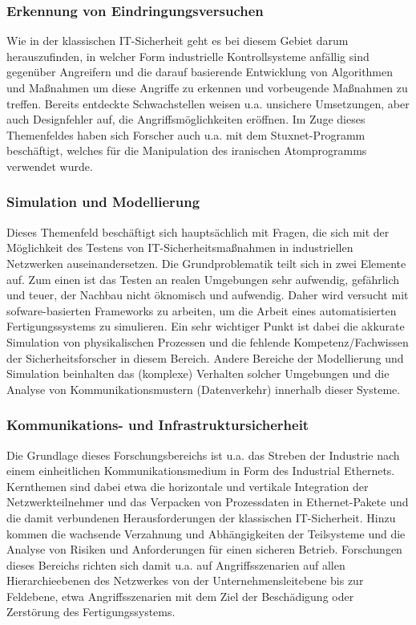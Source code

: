 \subsubsection{Erkennung von Eindringungsversuchen}
Wie in der klassischen IT-Sicherheit geht es bei diesem Gebiet darum herauszufinden, in welcher Form industrielle Kontrollsysteme anfällig sind gegenüber Angreifern und die darauf basierende Entwicklung von Algorithmen und Maßnahmen um diese Angriffe zu erkennen und vorbeugende Maßnahmen zu treffen. Bereits entdeckte Schwachstellen weisen u.a. unsichere Umsetzungen, aber auch Designfehler auf, die Angriffsmöglichkeiten eröffnen. Im Zuge dieses Themenfeldes haben sich Forscher auch u.a. mit dem Stuxnet-Programm beschäftigt, welches für die Manipulation des iranischen Atomprogramms verwendet wurde.

\subsubsection{Simulation und Modellierung}
Dieses Themenfeld beschäftigt sich hauptsächlich mit Fragen, die sich mit der Möglichkeit des Testens von IT-Sicherheitsmaßnahmen in industriellen Netzwerken auseinandersetzen. Die Grundproblematik teilt sich in zwei Elemente auf. Zum einen ist das Testen an realen Umgebungen sehr aufwendig, gefährlich und teuer, der Nachbau nicht öknomisch und aufwendig. Daher wird versucht mit sofware-basierten Frameworks zu arbeiten, um die Arbeit eines automatisierten Fertigungssystems zu simulieren. Ein sehr wichtiger Punkt ist dabei die akkurate Simulation von physikalischen Prozessen und die fehlende Kompetenz/Fachwissen der Sicherheitsforscher in diesem Bereich. Andere Bereiche der Modellierung und Simulation beinhalten das (komplexe) Verhalten solcher Umgebungen und die Analyse von Kommunikationsmustern (Datenverkehr) innerhalb dieser Systeme.

\subsubsection{Kommunikations- und Infrastruktursicherheit}
Die Grundlage dieses Forschungsbereichs ist u.a. das Streben der Industrie nach einem einheitlichen Kommunikationsmedium in Form des Industrial Ethernets. Kernthemen sind dabei etwa die horizontale und vertikale Integration der Netzwerkteilnehmer und das Verpacken von Prozessdaten in Ethernet-Pakete und die damit verbundenen Herausforderungen der klassischen IT-Sicherheit. 
Hinzu kommen die wachsende Verzahnung und Abhängigkeiten der Teilsysteme und die Analyse von Risiken und Anforderungen für einen sicheren Betrieb. Forschungen dieses Bereichs richten sich damit u.a. auf Angriffsszenarien auf allen Hierarchieebenen des Netzwerkes von der Unternehmensleitebene bis zur Feldebene, etwa Angriffsszenarien mit dem Ziel der Beschädigung oder Zerstörung des Fertigungssystems.


